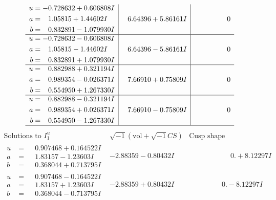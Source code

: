 \documentclass[1p]{elsarticle_modified}
\theoremstyle{definition}
\newcommand{\I}{\sqrt{-1}}
\begin{document}
$$\begin{array}{c|c|c}
\begin{aligned}
u &= -0.728632 + 0.606808 I \\
a &= \phantom{-}1.05815 + 1.44602 I \\
b &= \phantom{-}0.832891 - 1.079930 I\end{aligned}
 & \phantom{-}6.64396 + 5.86161 I & \phantom{-0.000000 } 0 \\ \hline\begin{aligned}
u &= -0.728632 - 0.606808 I \\
a &= \phantom{-}1.05815 - 1.44602 I \\
b &= \phantom{-}0.832891 + 1.079930 I\end{aligned}
 & \phantom{-}6.64396 - 5.86161 I & \phantom{-0.000000 } 0 \\ \hline\begin{aligned}
u &= \phantom{-}0.882988 + 0.321194 I \\
a &= \phantom{-}0.989354 - 0.026371 I \\
b &= \phantom{-}0.554950 + 1.267330 I\end{aligned}
 & \phantom{-}7.66910 + 0.75809 I & \phantom{-0.000000 } 0 \\ \hline\begin{aligned}
u &= \phantom{-}0.882988 - 0.321194 I \\
a &= \phantom{-}0.989354 + 0.026371 I \\
b &= \phantom{-}0.554950 - 1.267330 I\end{aligned}
 & \phantom{-}7.66910 - 0.75809 I & \phantom{-0.000000 } 0\\
 \hline 
 \end{array}$$\newpage$$\begin{array}{c|c|c}  
\text{Solutions to }I^u_{1}& \I (\text{vol} + \sqrt{-1}CS) & \text{Cusp shape}\\
 \hline 
\begin{aligned}
u &= \phantom{-}0.907468 + 0.164522 I \\
a &= \phantom{-}1.83157 - 1.23603 I \\
b &= \phantom{-}0.368044 + 0.713795 I\end{aligned}
 & -2.88359 - 0.80432 I & \phantom{-0.000000 -}0. + 8.12297 I \\ \hline\begin{aligned}
u &= \phantom{-}0.907468 - 0.164522 I \\
a &= \phantom{-}1.83157 + 1.23603 I \\
b &= \phantom{-}0.368044 - 0.713795 I\end{aligned}
 & -2.88359 + 0.80432 I & \phantom{-0.000000 } 0. - 8.12297 I \\ \hline\begin{aligned}

\end{aligned}
\end{array}$$
\end{document}
